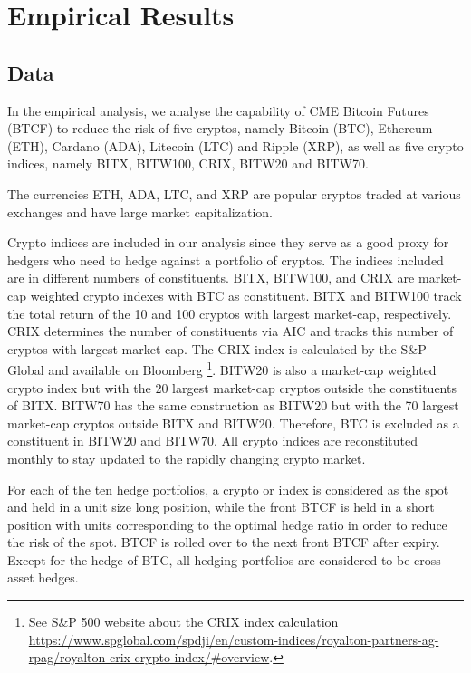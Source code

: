 \documentclass[11pt,a4paper,english]{article}
\begin{document}
\section{Empirical Results}\label{sec:results}

\subsection{Data}\label{subsec:data}
In the empirical analysis, we analyse the capability 
of CME Bitcoin Futures (BTCF) to reduce the risk of
five cryptos, namely Bitcoin (BTC), Ethereum 
(ETH), Cardano (ADA), Litecoin (LTC) and Ripple (XRP), as well as five
crypto indices, namely BITX, BITW100, CRIX, BITW20 and BITW70.

The currencies ETH, ADA, LTC, and XRP are popular cryptos traded at
various exchanges and have large market capitalization. 


Crypto indices are included in our analysis since they serve as a good proxy
for hedgers who need to hedge against a portfolio of cryptos.
The indices included are in different numbers of constituents. 
BITX, BITW100, and CRIX are market-cap weighted crypto indexes with
BTC as constituent. 
BITX and BITW100 track the total return of the 10 and 100 cryptos
with largest market-cap, respectively. 
CRIX determines the number of constituents via AIC and tracks this
number of cryptos with largest market-cap. 
The CRIX index is calculated by the S\&P Global and available on Bloomberg
\footnote{See S\&P 500 website about the CRIX index calculation \url{https://www.spglobal.com/spdji/en/custom-indices/royalton-partners-ag-rpag/royalton-crix-crypto-index/\#overview}.}.
BITW20 is also a market-cap weighted crypto index but with the 20
largest market-cap cryptos outside the constituents of BITX.
BITW70 has the same construction as BITW20 but with the 70 largest
market-cap cryptos outside BITX and BITW20. 
Therefore, BTC is excluded as a constituent in BITW20 and BITW70.
All crypto indices are reconstituted monthly to stay updated to the rapidly changing crypto market. 

For each of the ten hedge portfolios, a crypto or index is considered
as the spot and held in a unit size long position, while 
the front BTCF is held in a short position with units corresponding to
the optimal hedge ratio in order to reduce the risk of the spot. 
BTCF is rolled over to the next front BTCF after expiry. 
Except for the hedge of BTC, all hedging portfolios are considered to
be cross-asset hedges. 
\end{document}
